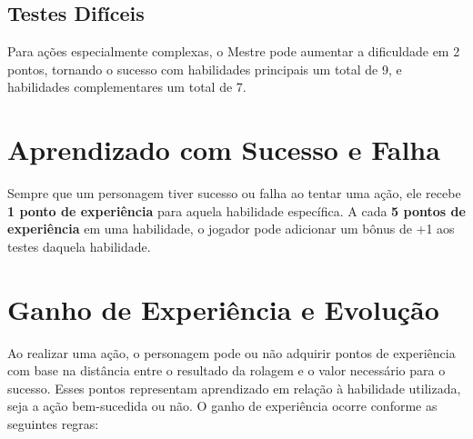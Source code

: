 \documentclass[a4paper,12pt]{book}
\begin{document}
\subsection{Testes Difíceis}

Para ações especialmente complexas, o Mestre pode aumentar a dificuldade em 2 pontos, tornando o sucesso com habilidades principais um total de 9, e habilidades complementares um total de 7.

\section{Aprendizado com Sucesso e Falha}

Sempre que um personagem tiver sucesso ou falha ao tentar uma ação, ele recebe \textbf{1 ponto de experiência} para aquela habilidade específica. A cada \textbf{5 pontos de experiência} em uma habilidade, o jogador pode adicionar um bônus de +1 aos testes daquela habilidade.

\section{Ganho de Experiência e Evolução}

Ao realizar uma ação, o personagem pode ou não adquirir pontos de experiência com base na distância entre o resultado da rolagem e o valor necessário para o sucesso. Esses pontos representam aprendizado em relação à habilidade utilizada, seja a ação bem-sucedida ou não. O ganho de experiência ocorre conforme as seguintes regras:
\end{document}
